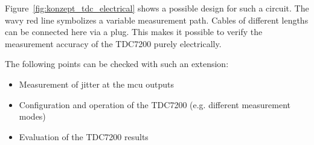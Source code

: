 Figure~\ref{fig:konzept_tdc_electrical} shows a possible design for such a circuit. The wavy
red line symbolizes a variable measurement path. Cables of different lengths can be connected here via a plug.
This makes it possible to verify the measurement accuracy of the TDC7200 purely electrically.

The following points can be checked with such an extension:

\begin{itemize}
    \item Measurement of jitter at the \acrshort{mcu} outputs
    \item Configuration and operation of the TDC7200 (e.g. different measurement modes)
    \item Evaluation of the TDC7200 results
\end{itemize}
